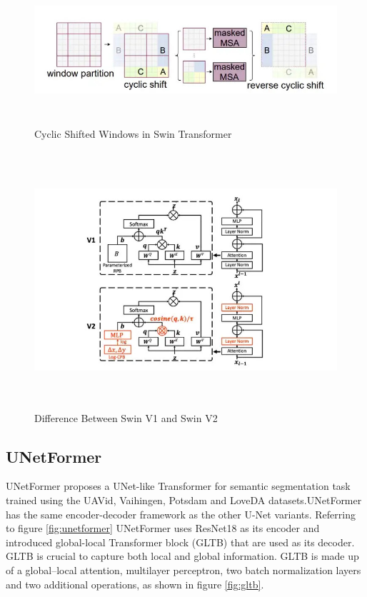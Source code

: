 \begin{figure}[ht]
\includegraphics[width=13.5cm, height=5.5cm]{images/swin-cyclic-shift.jpg}
\centering
\caption{Cyclic Shifted Windows in Swin Transformer}
\label{fig:swin cyclic}
\end{figure}

\FloatBarrier
\begin{figure}[ht]
\includegraphics[width=13.5cm, height=9.5cm]{images/swin1-vs-swin2.jpg}
\centering
\caption{Difference Between Swin V1 and Swin V2}
\label{fig:swin v1 vs v2}
\end{figure}
\FloatBarrier

\subsection{UNetFormer}
UNetFormer \cite{unetformer} proposes a UNet-like Transformer for semantic segmentation task trained using the UAVid, Vaihingen, Potsdam and LoveDA datasets.UNetFormer has the same encoder-decoder framework as the other U-Net variants. Referring to figure \ref{fig:unetformer} UNetFormer uses ResNet18 as its encoder and introduced global-local Transformer block (GLTB) that are used as its decoder. GLTB is crucial to capture both local and global information. GLTB is made up of a global–local attention, multilayer perceptron, two batch normalization layers and two additional operations, as shown in figure \ref{fig:gltb}.

